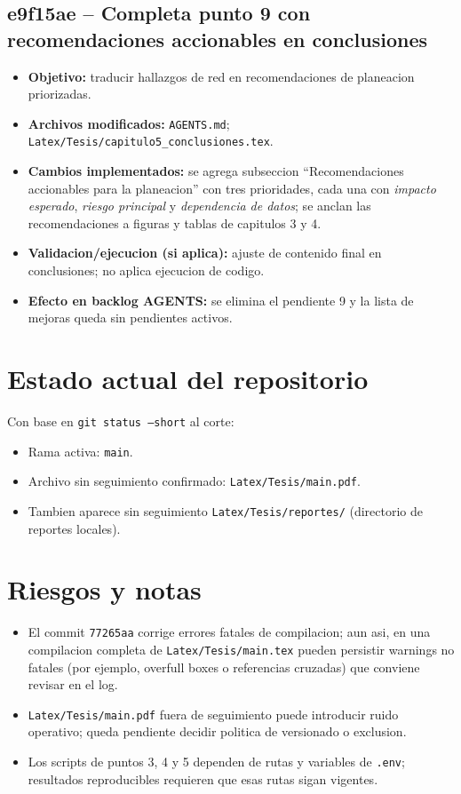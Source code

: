 \documentclass[11pt]{article}
\begin{document}
\subsection{e9f15ae -- Completa punto 9 con recomendaciones accionables en conclusiones}
\begin{itemize}
  \item \textbf{Objetivo:} traducir hallazgos de red en recomendaciones de planeacion priorizadas.
  \item \textbf{Archivos modificados:} \texttt{AGENTS.md}; \texttt{Latex/Tesis/capitulo5\_conclusiones.tex}.
  \item \textbf{Cambios implementados:} se agrega subseccion ``Recomendaciones accionables para la planeacion'' con tres prioridades, cada una con \textit{impacto esperado}, \textit{riesgo principal} y \textit{dependencia de datos}; se anclan las recomendaciones a figuras y tablas de capitulos 3 y 4.
  \item \textbf{Validacion/ejecucion (si aplica):} ajuste de contenido final en conclusiones; no aplica ejecucion de codigo.
  \item \textbf{Efecto en backlog AGENTS:} se elimina el pendiente 9 y la lista de mejoras queda sin pendientes activos.
\end{itemize}

\section{Estado actual del repositorio}
Con base en \texttt{git status --short} al corte:
\begin{itemize}
  \item Rama activa: \texttt{main}.
  \item Archivo sin seguimiento confirmado: \texttt{Latex/Tesis/main.pdf}.
  \item Tambien aparece sin seguimiento \texttt{Latex/Tesis/reportes/} (directorio de reportes locales).
\end{itemize}

\section{Riesgos y notas}
\begin{itemize}
  \item El commit \texttt{77265aa} corrige errores fatales de compilacion; aun asi, en una compilacion completa de \texttt{Latex/Tesis/main.tex} pueden persistir warnings no fatales (por ejemplo, overfull boxes o referencias cruzadas) que conviene revisar en el log.
  \item \texttt{Latex/Tesis/main.pdf} fuera de seguimiento puede introducir ruido operativo; queda pendiente decidir politica de versionado o exclusion.
  \item Los scripts de puntos 3, 4 y 5 dependen de rutas y variables de \texttt{.env}; resultados reproducibles requieren que esas rutas sigan vigentes.
\end{itemize}
\end{document}

